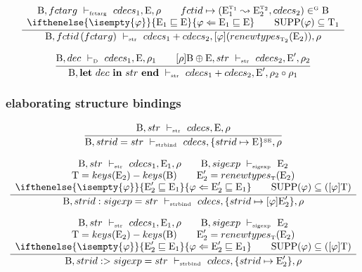 \documentclass[11pt,a4paper]{article}
\newcommand{\key}[1]{\textrm{\textbf{#1}}}
\newcommand{\End}       {\key{end}}
\newcommand{\Let}       {\key{let}}
\newcommand{\In}        {\key{in}}
\newcommand{\B}  {\textrm{B}}
\newcommand{\E}  {\textrm{E}}
\newcommand{\T}  {\textrm{T}}
\newcommand{\sT} {\textrm{\tiny T}}
\newcommand{\sSE}{\textrm{\tiny SE}}
\newcommand{\sG} {\textrm{\tiny G}}
\newcommand{\vdashSigexp}  {\ \vdash_{\textrm{\tiny sigexp}}\ }
\newcommand{\vdashStr}		{\ \vdash_{\textrm{\tiny str}}\ }
\newcommand{\vdashStrBind} {\ \vdash_{\textrm{\tiny strbind}}\ }
\newcommand{\vdashFctArg}  {\ \vdash_{\textrm{\tiny fctarg}}\ }
\newcommand{\vdashD}       {\ \vdash_{\textrm{\tiny D}}\ }
\newcommand{\braced}[1]{\{#1\}}
\newcommand{\fctor}[2]{#1 \leadsto #2}
\newcommand{\matchEnv}[3][]{ \ifthenelse{\isempty{#1}}{#2 \sqsubseteq #3}{#1 \Leftarrow #2 \sqsubseteq #3}}
\newcommand{\SUPP}[1]{\textrm{SUPP}(#1)}
\newcommand{\KEYS}[1]{keys(#1)}
\newcommand{\TYNAMES}[1]{\KEYS{#1}}
\newcommand{\GENTYPES}[2]{renewtypes_{\textrm{\tiny $#1$}}(#2)}
\newcommand{\compose}[2]{#1 \circ #2}
\begin{document}
\[
\cfrac
 {\begin{array}{c}
  \B,fctarg \vdashFctArg cdecs_1, \E, \rho                              	\qquad
  fctid \mapsto (\fctor{\E_1^{\sT_1}}{\E_2^{\sT_2}}, cdecs_2) \in^\sG \B  	\\
  \matchEnv[\varphi]{\E_1}{\E}                                          	\qquad
  \SUPP{\varphi}\subseteq \T_1                                          	\\
  \end{array}}
 {\B,fctid\,(fctarg) \vdashStr cdecs_1 + cdecs_2, [\varphi](\GENTYPES{\T_2}{\E_2}), \rho}
\]

\[
\cfrac
 {\B, dec \vdashD cdecs_1,\E, \rho_1                    \qquad
  [\rho]\B \oplus \E, str \vdashStr cdecs_2, \E', \rho_2}
 {\B, \Let\ dec\ \In\ str\ \End \vdashStr cdecs_1+cdecs_2,\E', \compose{\rho_2}{\rho_1}}
\]

\subsubsection{elaborating structure bindings}

\[
\cfrac
 {\B, str \vdashStr cdecs, \E, \rho}
 {\B, strid = str \vdashStrBind cdecs, \braced{strid \mapsto \E}^\sSE, \rho}
\]

\[
\cfrac
 {\begin{array}{c}
  \B, str    \vdashStr    cdecs_1, \E_1, \rho    \qquad
  \B, sigexp \vdashSigexp \E_2                   \\
  \T = \TYNAMES{\E_2}-\TYNAMES{\B}               \qquad
  \E'_2 = \GENTYPES{\T}{\E_2}                    \\
  \matchEnv[\varphi]{\E'_2}{\E_1}                \qquad
  \SUPP{\varphi} \subseteq ([\varphi]\T)
  \end{array}}
 {\B, strid: sigexp = str \vdashStrBind cdecs, \braced{strid \mapsto [\varphi]\E'_2}, \rho}
\]

\[
\cfrac
 {\begin{array}{c}
  \B, str    \vdashStr    cdecs_1, \E_1, \rho    \qquad
  \B, sigexp \vdashSigexp \E_2                   \\
  \T = \TYNAMES{\E_2}-\TYNAMES{\B}               \qquad
  \E'_2 = \GENTYPES{\T}{\E_2}                    \\
  \matchEnv[\varphi]{\E'_2}{\E_1}                \qquad
  \SUPP{\varphi} \subseteq ([\varphi]\T)
  \end{array}}
 {\B, strid:>sigexp = str \vdashStrBind cdecs, \braced{strid \mapsto \E'_2}, \rho}
\]
\end{document}
